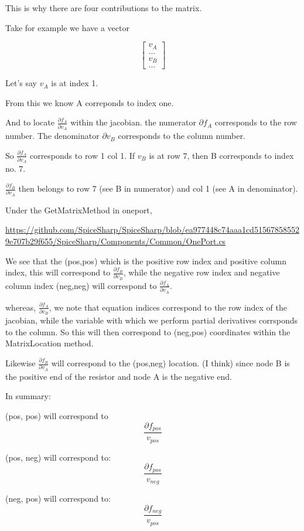 \documentclass[12pt]{article}
\renewcommand{\_}{\kern-1.5pt\textunderscore\kern-1.5pt}
\begin{document}
This is why there are four contributions to the matrix. 

Take for example we have a vector

$$
\begin{bmatrix}
v_A \\
... \\
v_B \\
...
\end{bmatrix}
$$

Let's say $v_A$ is at index 1.

From this we know A correponds to index one.

And to locate $\frac{\partial f_A}{\partial v_A}$ within the jacobian. the numerator $\partial f_A$ corresponds to the row number. The denominator $\partial v_B$ corresponds to the column number.

So $\frac{\partial f_A}{\partial v_A}$ corresponds to row 1 col 1. If $v_B$ is at row 7, then B corresponds to index no. 7.

$\frac{\partial f_B}{\partial v_A}$ then belongs to row 7 (see B in numerator) and col 1 (see A in denominator).

Under the GetMatrixMethod in oneport,

\url{https://github.com/SpiceSharp/SpiceSharp/blob/ea977448c74aaa1cd515678585529e707b29f655/SpiceSharp/Components/Common/OnePort.cs}

We see that the (pos,pos) which is the positive row index and positive column index, this will correspond to $\frac{\partial f_B}{\partial v_B}$, while the negative row index and negative column index (neg,neg) will correspond to $\frac{\partial f_A}{\partial v_A}$.

whereas, $\frac{\partial f_A}{\partial v_B}$, we note that equation indices correspond to the row index of the jacobian, while the variable with which we perform partial derivatives corrsponds to the column. So this will then correspond to (neg,pos) coordinates within the MatrixLocation method.

Likewise $\frac{\partial f_B}{\partial v_A}$ will correspond to the (pos,neg) location. (I think) since node B is the positive end of the resistor and node A is the negative end. 

In summary:

(pos, pos) will correspond to
$$\frac{\partial f_{pos}}{v_{pos}}$$

(pos, neg) will correspond to:
$$\frac{\partial f_{pos}}{v_{neg}}$$

(neg, pos) will correspond to:
$$\frac{\partial f_{neg}}{v_{pos}}$$
\end{document}
